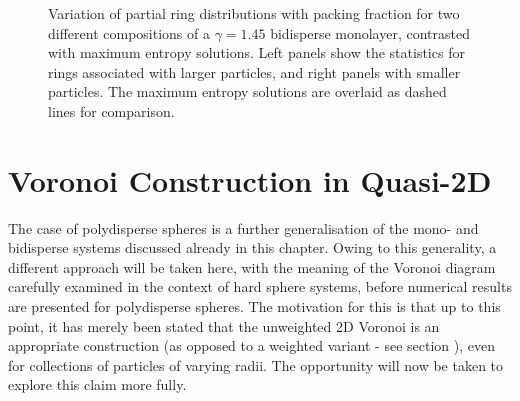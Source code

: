 \begin{figure}[bt]
     \caption{Variation of partial ring distributions with packing fraction for two different compositions of a $\gamma=1.45$ bidisperse monolayer, contrasted with maximum entropy solutions. Left panels show the statistics for rings associated with larger particles, and right panels with smaller particles. The maximum entropy solutions are overlaid as dashed lines for comparison.}
     \label{fig:bime}
\end{figure}

\section{Voronoi Construction in Quasi\--2D}

The case of \qtd{} polydisperse spheres is a further generalisation of the mono\-- and bidisperse systems discussed already in this chapter.
Owing to this generality, a different approach will be taken here, with the meaning of the Voronoi diagram carefully examined in the context of \qtd{} hard sphere systems, before numerical results are presented for polydisperse spheres.
The motivation for this is that up to this point, it has merely been stated that the unweighted 2D Voronoi is an appropriate construction (as opposed to a weighted variant - see section ), even for collections of particles of varying radii.
The opportunity will now be taken to explore this claim more fully.

